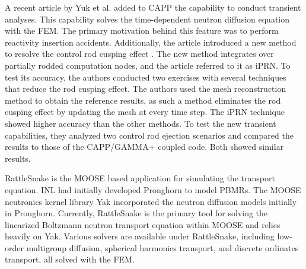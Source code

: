 A recent article by Yuk et al. \cite{yuk_time-dependent_2020} added to CAPP the capability to conduct transient analyses.
This capability solves the time-dependent neutron diffusion equation with the \gls{FEM}.
The primary motivation behind this feature was to perform reactivity insertion accidents.
Additionally, the article introduced a new method to resolve the control rod cusping effect \cite{joo_resolution_1984}.
The new method integrates over partially rodded computation nodes, and the article referred to it as iPRN.
To test its accuracy, the authors conducted two exercises with several techniques that reduce the rod cusping effect.
The authors used the mesh reconstruction method to obtain the reference results, as such a method eliminates the rod cusping effect by updating the mesh at every time step.
The iPRN technique showed higher accuracy than the other methods.
To test the new transient capabilities, they analyzed two control rod ejection scenarios and compared the results to those of the CAPP/GAMMA+ coupled code.
Both showed similar results.

RattleSnake \cite{wang_rattlesnake_2019} is the MOOSE \cite{gaston_moose_2009} based application for simulating the transport equation.
\gls{INL} had initially developed Pronghorn \cite{strydom_inl_2013} to model \glspl{PBMR}.
The MOOSE neutronics kernel library Yak incorporated the neutron diffusion models initially in Pronghorn.
Currently, RattleSnake is the primary tool for solving the linearized Boltzmann neutron transport equation within MOOSE and relies heavily on Yak.
Various solvers are available under RattleSnake, including low-order multigroup diffusion, spherical harmonics transport, and discrete ordinates transport, all solved with the \gls{FEM}.

